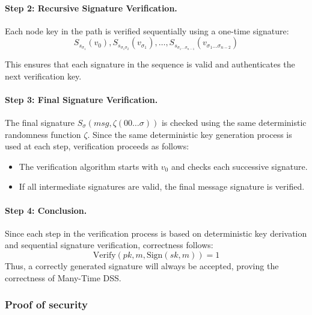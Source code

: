 \paragraph{Step 2: Recursive Signature Verification.}
Each node key in the path is verified sequentially using a one-time signature:
\begin{equation}
    S_{s_{\sigma_1}} (v_0), S_{s_{\sigma_1 \sigma_2}} (v_{\sigma_1}), \dots, S_{s_{\sigma_1 \dots \sigma_{n-1}}} (v_{\sigma_1 \dots \sigma_{n-2}})
\end{equation}

This ensures that each signature in the sequence is valid and authenticates the next verification key.

\paragraph{Step 3: Final Signature Verification.}
The final signature \( S_{\sigma}(msg, \zeta(00\dots\sigma)) \) is checked using the same deterministic randomness function \( \zeta \). Since the same deterministic key generation process is used at each step, verification proceeds as follows:

\begin{itemize}
    \item The verification algorithm starts with \( v_0 \) and checks each successive signature.
    \item If all intermediate signatures are valid, the final message signature is verified.
\end{itemize}

\paragraph{Step 4: Conclusion.}
Since each step in the verification process is based on deterministic key derivation and sequential signature verification, correctness follows:
\begin{equation}
    \text{Verify}(pk, m, \text{Sign}(sk, m)) = 1
\end{equation}
Thus, a correctly generated signature will always be accepted, proving the correctness of Many-Time DSS.

\subsubsection{Proof of security}

